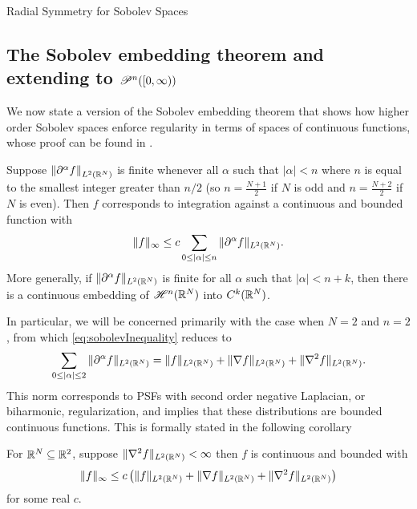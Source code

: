 \begin{chapter}{Radial Symmetry for Sobolev Spaces}
\subsection{The Sobolev embedding theorem and extending to $\mathscr P^n([0,\infty))$}

We now state a version of the Sobolev embedding theorem that shows how higher order Sobolev spaces enforce regularity in terms of spaces of continuous functions, whose proof can be found in \citep{strichartz2003guide}.
\begin{thm} \label{thm:sobolevInequality}
  Suppose $\left\|\partial^\alpha f\right\|_{L^2(\mathbb R^N)}$ is finite whenever all $\alpha$ such that $|\alpha| <n$ where $n$ is equal to the smallest integer greater than $n/2$ (so $n=\frac{N+1}2$ if $N$ is odd and $n=\frac{N+2}2$ if $N$ is even). Then $f$ corresponds to integration against a continuous and bounded function with
  \begin{equation} \label{eq:sobolevInequality}
    \| f \|_\infty \le c \sum_{0\le |\alpha| \le n}\|\partial^\alpha f\|_{L^2(\mathbb R^N)}.
  \end{equation}
  More generally, if  $\|\partial^\alpha f\|_{L^2(\mathbb R^N)}$ is finite for all $\alpha$ such that $|\alpha| < n + k$, then there is a continuous embedding of $\mathscr H^n(\mathbb R^N)$ into $C^k(\mathbb R^N)$.
\end{thm}

In particular, we will be concerned primarily with the case when $N=2$ and $n=2$, from which \eqref{eq:sobolevInequality} reduces to
\begin{equation}
  \sum_{0\le |\alpha| \le 2}\|\del^\alpha f\|_{L^2(\R^N)} = \|f\|_{L^2(\R^N)} + \|\nabla f\|_{L^2(\R^N)}+ \|\nabla^2 f\|_{L^2(\R^N)}. %
\end{equation}
This norm corresponds to PSFs with second order negative Laplacian, or biharmonic, regularization, and  implies that these distributions are bounded continuous functions.
This is formally stated in the following corollary

\begin{cor} \label{cor:sobolev}
  For $\mathbb R^N \subseteq \mathbb R^2$, suppose $\|\nabla^2 f\|_{L^2(\mathbb R^N)} < \infty$ then $f$ is continuous and bounded with  
  \begin{equation}
    \| f \|_\infty \le c\left(\|f\|_{L^2(\mathbb R^N)} + \| \nabla f\|_{L^2(\mathbb R^N)}+ \| \nabla^2 f\|_{L^2(\mathbb R^N)}\right)
  \end{equation}
  for some real $c$.
\end{cor}


\end{chapter}
